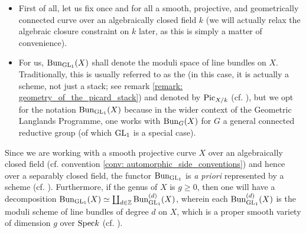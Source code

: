             \begin{convention} \label{conv: automorphic_side_conventions}
                \noindent
                \begin{itemize}
                    \item First of all, let us fix once and for all a smooth, projective, and geometrically connected curve over an algebraically closed field $k$ (we will actually relax the algebraic closure constraint on $k$ later, as this is simply a matter of convenience).
                    \item For us, $\mathrm{Bun}_{\operatorname{GL}_1}(X)$ shall denote the moduli space of line bundles on $X$. Traditionally, this is usually referred to as the  (in this case, it is actually a scheme, not just a stack; see remark \ref{remark: geometry_of_the_picard_stack}) and denoted by $\mathrm{Pic}_{X/k}$ (cf. \cite[\href{https://stacks.math.columbia.edu/tag/0372}{Tag 0372}]{stacks}), but we opt for the notation $\mathrm{Bun}_{\operatorname{GL}_1}(X)$ because in the wider context of the Geometric Langlands Programme, one works with $\mathrm{Bun}_G(X)$ for $G$ a general connected reductive group (of which $\operatorname{GL}_1$ is a special case). 
                \end{itemize}
            \end{convention}
            \begin{remark} \label{remark: geometry_of_the_picard_stack}
                Since we are working with a smooth projective curve $X$ over an algebraically closed field (cf. convention \ref{conv: automorphic_side_conventions}) and hence over a separably closed field, the functor $\mathrm{Bun}_{\operatorname{GL}_1}$ is \textit{a priori} represented by a scheme (cf. \cite[\href{https://stacks.math.columbia.edu/tag/0B9Z}{Tag 0B9Z}]{stacks}). Furthermore, if the genus of $X$ is $g \geq 0$, then one will have a decomposition $\mathrm{Bun}_{\operatorname{GL}_1}(X) \simeq \coprod_{d \in \mathbb{Z}} \mathrm{Bun}_{\operatorname{GL}_1}^{(d)}(X)$, wherein each $\mathrm{Bun}_{\operatorname{GL}_1}^{(d)}(X)$ is the moduli scheme of line bundles of degree $d$  on $X$, which is a proper smooth variety of dimension $g$ over $\mathrm{Spec} k$ (cf. \cite[\href{https://stacks.math.columbia.edu/tag/0BA0}{Tag 0BA0}]{stacks}).
            \end{remark}
            
